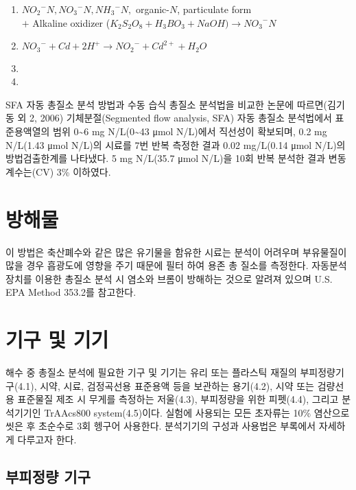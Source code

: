 \documentclass[
]{book}
\providecommand{\tightlist}{%
  \setlength{\itemsep}{0pt}\setlength{\parskip}{0pt}}
\begin{document}
\begin{enumerate}
\def\labelenumi{(\arabic{enumi})}
\tightlist
\item
  \({NO_{2}}^{-}N, {NO_{3}}^{-}N, {NH_{3}}^{-}N,\) organic-\(N\), particulate form\\
  \(+\) Alkaline oxidizer (\(K_{2}S_{2}O_{8}+H_{3}BO_{3}+NaOH) → {NO_{3}}^{-}N\)
\item
  \({NO_{3}}^{-} + Cd + 2H^{+} → {NO_{2}}^{-} + Cd^{2+} + H_{2}O\)\\
\item
\item
\end{enumerate}

SFA 자동 총질소 분석 방법과 수동 습식 총질소 분석법을 비교한 논문에 따르면(김기동 외 2, 2006) 기체분절(Segmented flow analysis, SFA) 자동 총질소 분석법에서 표준용액열의 범위 0\textasciitilde6 mg N/L(0\textasciitilde43 μmol N/L)에서 직선성이 확보되며, 0.2 mg N/L(1.43 μmol N/L)의 시료를 7번 반복 측정한 결과 0.02 mg/L(0.14 μmol N/L)의 방법검출한계를 나타냈다. 5 mg N/L(35.7 μmol N/L)을 10회 반복 분석한 결과 변동계수는(CV) 3\% 이하였다.

\hypertarget{uxbc29uxd574uxbb3c-2}{%
\section{방해물}\label{uxbc29uxd574uxbb3c-2}}

이 방법은 축산폐수와 같은 많은 유기물을 함유한 시료는 분석이 어려우며 부유물질이 많을 경우 흡광도에 영향을 주기 때문에 필터 하여 용존 총 질소를 측정한다. 자동분석장치를 이용한 총질소 분석 시 염소와 브롬이 방해하는 것으로 알려져 있으며 U.S. EPA Method 353.2를 참고한다.

\hypertarget{uxae30uxad6c-uxbc0f-uxae30uxae30-2}{%
\section{기구 및 기기}\label{uxae30uxad6c-uxbc0f-uxae30uxae30-2}}

해수 중 총질소 분석에 필요한 기구 및 기기는 유리 또는 플라스틱 재질의 부피정량기구(4.1), 시약, 시료, 검정곡선용 표준용액 등을 보관하는 용기(4.2), 시약 또는 검량선용 표준물질 제조 시 무게를 측정하는 저울(4.3), 부피정량을 위한 피펫(4.4), 그리고 분석기기인 TrAAcs800 system(4.5)이다. 실험에 사용되는 모든 초자류는 10\% 염산으로 씻은 후 초순수로 3회 헹구어 사용한다. 분석기기의 구성과 사용법은 부록에서 자세하게 다루고자 한다.

\hypertarget{uxbd80uxd53cuxc815uxb7c9-uxae30uxad6c-1}{%
\subsection{부피정량 기구}\label{uxbd80uxd53cuxc815uxb7c9-uxae30uxad6c-1}}
\end{document}
